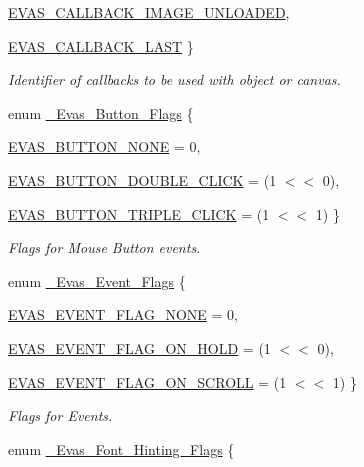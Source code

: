 \begin{DoxyCompactItemize}
\par
\hyperlink{Evas_8h_a99e208e463a20499aabe6faac8a8cb8aaf0a0bdf43416c9c2a80dab7d052ac3f8}{EVAS\_\-CALLBACK\_\-IMAGE\_\-UNLOADED}, 
\par
\hyperlink{Evas_8h_a99e208e463a20499aabe6faac8a8cb8aab36d452d3fcb36aa19becaf700bde529}{EVAS\_\-CALLBACK\_\-LAST}
 \}
\begin{DoxyCompactList}\small\item\em Identifier of callbacks to be used with object or canvas. \item\end{DoxyCompactList}\item 
enum \hyperlink{Evas_8h_a9b61a9a46b5824fc358a5a8c82cda8b9}{\_\-Evas\_\-Button\_\-Flags} \{ \par
\hyperlink{Evas_8h_a9b61a9a46b5824fc358a5a8c82cda8b9a9aa240f9fc1551d374f470750aa3cfbd}{EVAS\_\-BUTTON\_\-NONE} =  0, 
\par
\hyperlink{Evas_8h_a9b61a9a46b5824fc358a5a8c82cda8b9ad73b8998592f86a575c9722cfa3bc46d}{EVAS\_\-BUTTON\_\-DOUBLE\_\-CLICK} =  (1 $<$$<$ 0), 
\par
\hyperlink{Evas_8h_a9b61a9a46b5824fc358a5a8c82cda8b9a530a626ac94996257011a8e2ba080a87}{EVAS\_\-BUTTON\_\-TRIPLE\_\-CLICK} =  (1 $<$$<$ 1)
 \}
\begin{DoxyCompactList}\small\item\em Flags for Mouse Button events. \item\end{DoxyCompactList}\item 
enum \hyperlink{Evas_8h_a89ffbc5f4d2796994c8b07ef95ef3d1a}{\_\-Evas\_\-Event\_\-Flags} \{ \par
\hyperlink{Evas_8h_a89ffbc5f4d2796994c8b07ef95ef3d1aa8c38841674b14dc2b2baec5d97d1f1cf}{EVAS\_\-EVENT\_\-FLAG\_\-NONE} =  0, 
\par
\hyperlink{Evas_8h_a89ffbc5f4d2796994c8b07ef95ef3d1aa2370cbd360270536042b7cfd8c7fcd83}{EVAS\_\-EVENT\_\-FLAG\_\-ON\_\-HOLD} =  (1 $<$$<$ 0), 
\par
\hyperlink{Evas_8h_a89ffbc5f4d2796994c8b07ef95ef3d1aa327728e91b3a2c6aa7a3fd9985bee311}{EVAS\_\-EVENT\_\-FLAG\_\-ON\_\-SCROLL} =  (1 $<$$<$ 1)
 \}
\begin{DoxyCompactList}\small\item\em Flags for Events. \item\end{DoxyCompactList}\item 
enum \hyperlink{group__Evas__Font__Group_ga49208864211c97ac1a09f03318aa253c}{\_\-Evas\_\-Font\_\-Hinting\_\-Flags} \{ \par

\end{DoxyCompactItemize}
